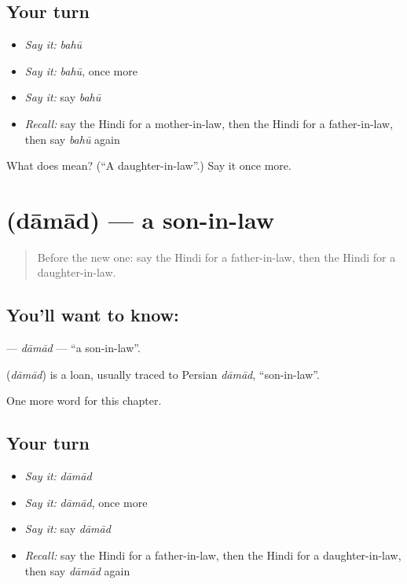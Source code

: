 \subsection*{Your turn}
\begin{itemize}
\raggedright
  \item \emph{Say it:} \emph{bahū}
  \item \emph{Say it:} \emph{bahū}, once more
  \item \emph{Say it:} say \emph{bahū}
  \item \emph{Recall:} say the Hindi for a mother-in-law, then the Hindi for a father-in-law, then say \emph{bahū} again
\end{itemize}

\begin{tcolorbox}[breakable,colback=teal!4,colframe=teal!35!black,title={Before you move on}]
What does  mean? (\textquotedblleft{}A daughter-in-law\textquotedblright{}.) Say it once more.
\end{tcolorbox}
\section[\texorpdfstring{\hi{दामाद} (dāmād)}{दामाद (dāmād)}]{ (dāmād) — a son-in-law}

\label{lesson:HI-C255-damad}



\begin{quote}
Before the new one: say the Hindi for a father-in-law, then the Hindi for a daughter-in-law.
\end{quote}

\subsection*{You'll want to know: }
\textbf{} — \emph{dāmād} — \textquotedblleft{}a son-in-law\textquotedblright{}.

\begin{cousinweb}
\textbf{} (\emph{dāmād}) is a loan, usually traced to Persian \emph{dāmād}, \textquotedblleft{}son-in-law\textquotedblright{}.
\end{cousinweb}

\begin{grammarlens}[title={What you've built}]
One more word for this chapter.
\end{grammarlens}

\subsection*{Your turn}
\begin{itemize}
\raggedright
  \item \emph{Say it:} \emph{dāmād}
  \item \emph{Say it:} \emph{dāmād}, once more
  \item \emph{Say it:} say \emph{dāmād}
  \item \emph{Recall:} say the Hindi for a father-in-law, then the Hindi for a daughter-in-law, then say \emph{dāmād} again
\end{itemize}

